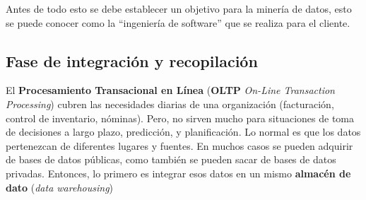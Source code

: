 \documentclass{article}
\begin{document}
Antes de todo esto se debe establecer un objetivo para la minería de datos, esto se puede conocer como la ``ingeniería de software'' que se realiza para el cliente.

\subsection{Fase de integración y recopilación}
El \textbf{Procesamiento Transacional en Línea} (\textbf{OLTP} \textit{On-Line Transaction Processing}) cubren las necesidades diarias de una organización (facturación, control de inventario, nóminas). Pero, no sirven mucho para situaciones de toma de decisiones a largo plazo, predicción, y planificación. Lo normal es que los datos pertenezcan de diferentes lugares y fuentes. En muchos casos se pueden adquirir de bases de datos públicas, como también se pueden sacar de bases de datos privadas. Entonces, lo primero es integrar esos datos en un mismo \textbf{almacén de dato} (\textit{data warehousing})
\end{document}
